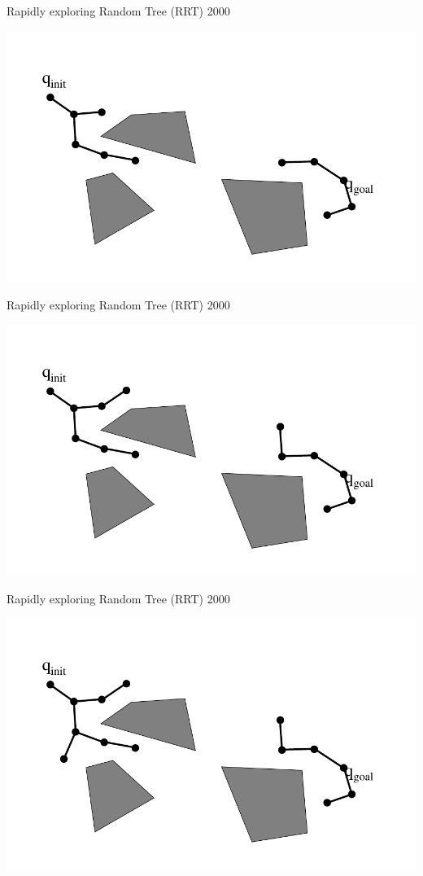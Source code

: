 \begin{frame} {Rapidly exploring Random Tree (RRT) 2000}
\centerline {
  \includegraphics[width=.8\linewidth]{figures/RRT15.pdf}
}
\end{frame}

\begin{frame} {Rapidly exploring Random Tree (RRT) 2000}
\centerline {
  \includegraphics[width=.8\linewidth]{figures/RRT16.pdf}
}
\end{frame}

\begin{frame} {Rapidly exploring Random Tree (RRT) 2000}
\centerline {
  \includegraphics[width=.8\linewidth]{figures/RRT17.pdf}
}
\end{frame}

